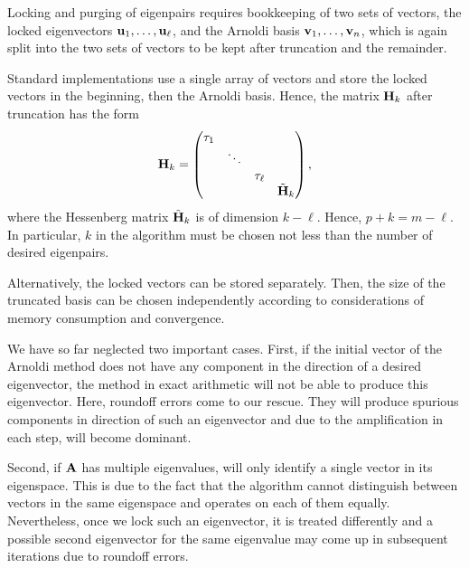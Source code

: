\begin{remark}
  Locking and purging of eigenpairs requires bookkeeping of two sets
  of vectors, the locked eigenvectors $\mathbf u_1,\dots,\mathbf u_\ell$, and the
  Arnoldi basis $\mathbf v_1,\dots,\mathbf v_n$, which is again split into the two
  sets of vectors to be kept after truncation and the remainder.

  Standard implementations use a single array of vectors and store the
  locked vectors in the beginning, then the Arnoldi basis. Hence, the
  matrix $\mathbf H_k$ after truncation has the form
  \begin{gather}
    \mathbf H_k =
    \begin{pmatrix}
      \tau_1\\&\ddots\\
      &&\tau_\ell\\
      &&& \tilde {\mathbf H}_k
    \end{pmatrix},
  \end{gather}
  where the Hessenberg matrix $\tilde {\mathbf H}_k$ is of dimension
  $k-\ell$.  Hence, $p+k = m-\ell$. In particular, $k$ in the
  algorithm must be chosen not less than the number of desired
  eigenpairs.

  Alternatively, the locked vectors can be stored separately. Then,
  the size of the truncated basis can be chosen independently
  according to considerations of memory consumption and convergence.
\end{remark}

\begin{remark}
  We have so far neglected two important cases. First, if the initial
  vector of the Arnoldi method does not have any component in the
  direction of a desired eigenvector, the method in exact arithmetic
  will not be able to produce this eigenvector. Here, roundoff errors
  come to our rescue. They will produce spurious components in
  direction of such an eigenvector and due to the amplification in
  each step, will become dominant.
  
  Second, if $\mathbf A$ has multiple eigenvalues,
   will only identify a single vector in its
  eigenspace. This is due to the fact that the algorithm cannot
  distinguish between vectors in the same eigenspace and operates on
  each of them equally. Nevertheless, once we lock such an
  eigenvector, it is treated differently and a possible second
  eigenvector for the same eigenvalue may come up in subsequent
  iterations due to roundoff errors.
\end{remark}

